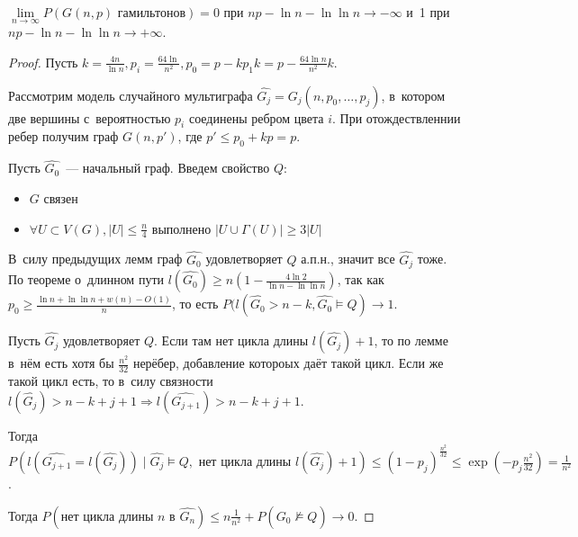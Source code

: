 \documentclass{article}
\begin{document}
\begin{theorem}[о~гамильтоновсти]
	$\lim\limits_{n \rightarrow \infty} P(G(n,p) \text{ гамильтонов}) = 0$ при $np - \ln n - \ln \ln n
	\rightarrow -\infty$ и~1 при $np - \ln n - \ln \ln n \rightarrow +\infty$.
\end{theorem}
\begin{proof}
	Пусть $k = \frac{4n}{\ln n}, p_i = \frac{64\ln}{n^2}, p_0 = p - kp_1k = p - \frac{64\ln n}{n^2}k$.

	Рассмотрим модель случайного мультиграфа $\hat{G_j} = G_j(n, p_0, \ldots, p_j)$, в~котором две
	вершины с~вероятностью $p_i$ соединены ребром цвета $i$. При отождествленнии ребер получим граф
	$G(n, p')$, где $p' \le p_0 + kp = p$.

	Пусть $\hat{G_0}$~--- начальный граф. Введем свойство $Q$:
	\begin{itemize}
		\item $G$ связен
		\item $\forall U \subset V(G), |U| \le \frac{n}{4}$ выполнено $|U \cup \Gamma(U)| \ge 3|U|$
	\end{itemize}

	В~силу предыдущих лемм граф $\hat{G_0}$ удовлетворяет $Q$ а.п.н., значит все $\hat{G_j}$ тоже. По
	теореме о~длинном пути $l(\hat{G_0}) \ge n\left(1 - \frac{4\ln2}{\ln n - \ln \ln n}\right)$, так
	как $p_0 \ge \frac{\ln n + \ln \ln n + w(n) - O(1)}{n}$, то есть $P(l(\hat{G_0} > n - k, \hat{G_0}
	\models Q) \rightarrow 1$.

	Пусть $\hat{G_j}$ удовлетворяет $Q$. Если там нет цикла длины $l(\hat{G_j})+1$, то по лемме в~нём
	есть хотя бы $\frac{n^2}{32}$ нерёбер, добавление котороых даёт такой цикл. Если же такой цикл
	есть, то в~силу связности $l(\hat{G_j}) > n - k + j + 1 \Rightarrow l(\hat{G_{j+1}}) > n - k + j +
	1$.

	Тогда $P(l(\hat{G_{j+1}}=l(\hat{G_j})) \mid \hat{G_j} \models Q, \text{ нет цикла длины }
	l(\hat{G_j})+1) \le (1 - p_j)^\frac{n^2}{32} \le \exp(-p_j \frac{n^2}{32}) = \frac{1}{n^2}$.

	Тогда $P(\text{нет цикла длины } n \text{ в~} \hat{G_n}) \le n\frac{1}{n^2} + P(\hat{G_0}
	\not\models Q) \rightarrow 0$.
\end{proof}
\end{document}
